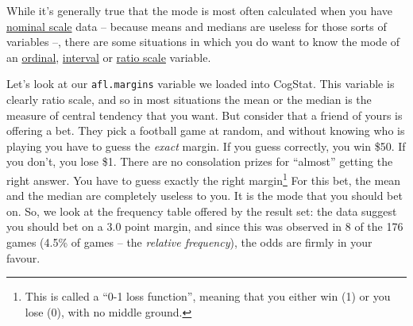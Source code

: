 \documentclass[
  11pt,
  a4paper,
  twoside,symmetric,openright]{book}
\theoremstyle{break}
\theoremstyle{break}
\begin{document}
While it's generally true that the mode is most often calculated when you have \protect\hyperlink{nominalscale}{nominal scale} data -- because means and medians are useless for those sorts of variables --, there are some situations in which you do want to know the mode of an \protect\hyperlink{ordinalscale}{ordinal}, \protect\hyperlink{intervalscale}{interval} or \protect\hyperlink{ratioscale}{ratio scale} variable.

\begin{example}
\protect\hypertarget{exm:exmode2}{}\label{exm:exmode2}Let's look at our \texttt{afl.margins} variable we loaded into CogStat. This variable is clearly ratio scale, and so in most situations the mean or the median is the measure of central tendency that you want. But consider that a friend of yours is offering a bet. They pick a football game at random, and without knowing who is playing you have to guess the \emph{exact} margin. If you guess correctly, you win \$50. If you don't, you lose \$1. There are no consolation prizes for ``almost'' getting the right answer. You have to guess exactly the right margin\footnote{This is called a ``0-1 loss function'', meaning that you either win (1) or you lose (0), with no middle ground.} For this bet, the mean and the median are completely useless to you. It is the mode that you should bet on. So, we look at the frequency table offered by the result set: the data suggest you should bet on a \(3.0\) point margin, and since this was observed in 8 of the 176 games (4.5\% of games -- the \emph{relative frequency}), the odds are firmly in your favour.
\end{example}
\end{document}
